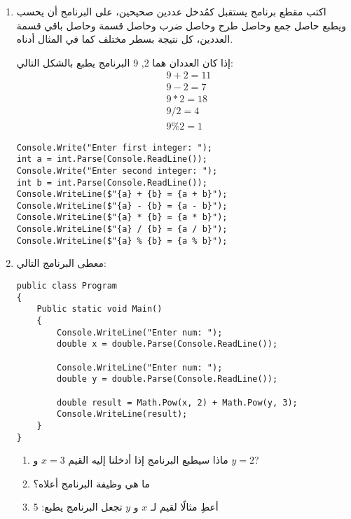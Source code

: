 ﻿\documentclass[12pt]{article}
\begin{document}
\begin{enumerate}[itemsep=2em]
\clearpage
\item
    اكتب مقطع برنامج يستقبل كمُدخل عددين صحيحين، على البرنامج أن يحسب ويطبع حاصل جمع وحاصل طرح وحاصل ضرب وحاصل قسمة وحاصل باقي قسمة العددين، كل نتيجة بسطر مختلف كما في المثال أدناه.
\begin{boxExample}
    إذا كان العددان هما 2, 9 البرنامج يطبع بالشكل التالي:
    \begin{align*}
        &9 + 2 = 11 \\
        &9 - 2 = 7 \\
        &9 * 2 = 18 \\
        &9 / 2 = 4 \\
        &9 \% 2 = 1
    \end{align*}
\end{boxExample}

\ifwithsols
\begin{boxSolution}
\begin{english}
\begin{verbatim}
Console.Write("Enter first integer: ");
int a = int.Parse(Console.ReadLine());
Console.Write("Enter second integer: ");
int b = int.Parse(Console.ReadLine());
Console.WriteLine($"{a} + {b} = {a + b}");
Console.WriteLine($"{a} - {b} = {a - b}");
Console.WriteLine($"{a} * {b} = {a * b}");
Console.WriteLine($"{a} / {b} = {a / b}");
Console.WriteLine($"{a} % {b} = {a % b}");
\end{verbatim}
\end{english}
\end{boxSolution}
\clearpage
\fi

\item
    معطى البرنامج التالي:
\begin{boxCode}
    \begin{english}
\begin{verbatim}
public class Program
{
    Public static void Main()
    {
        Console.WriteLine("Enter num: ");
        double x = double.Parse(Console.ReadLine());

        Console.WriteLine("Enter num: ");
        double y = double.Parse(Console.ReadLine());

        double result = Math.Pow(x, 2) + Math.Pow(y, 3);
        Console.WriteLine(result);
    }
}
\end{verbatim}
\end{english}
\end{boxCode}
\begin{enumerate}
    \item ماذا سيطبع البرنامج إذا أدخلنا إليه القيم \(x = 3\) و \(y = 2\)?
    \item ما هي وظيفة البرنامج أعلاه؟
    \item أعطِ مثالًا لقيم لـ $x$ و $y$ تجعل البرنامج يطبع: 5
\end{enumerate}


\end{enumerate}
\end{document}
